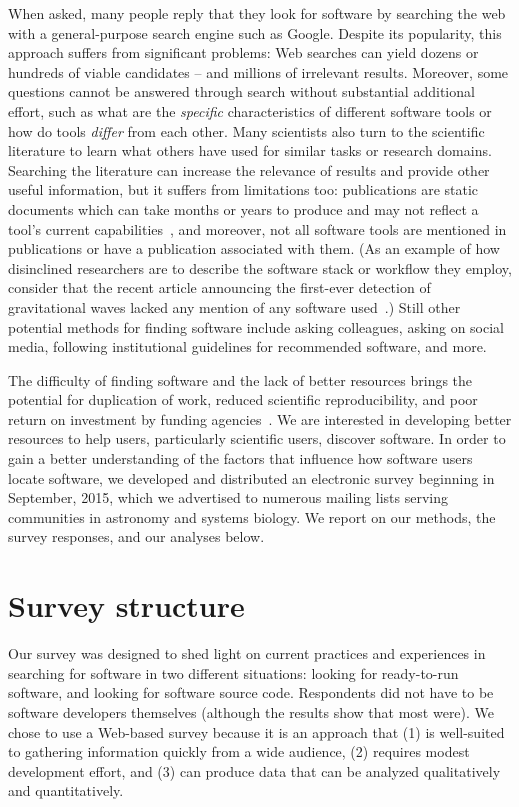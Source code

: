 \documentclass{casicswhitepaper}
\begin{document}
When asked, many people reply that they look for software by searching the web with a general-purpose search engine such as Google.  Despite its popularity, this approach suffers from significant problems: Web searches can yield dozens or hundreds of viable candidates -- and millions of irrelevant results.  Moreover, some questions cannot be answered through search without substantial additional effort, such as what are the \emph{specific} characteristics of different software tools or how do tools \emph{differ} from each other.  Many scientists also turn to the scientific literature to learn what others have used for similar tasks or research domains.  Searching the literature can increase the relevance of results and provide other useful information, but it suffers from limitations too: publications are static documents which can take months or years to produce and may not reflect a tool's current capabilities~\cite{wren_2004}, and moreover, not all software tools are mentioned in publications or have a publication associated with them.  (As an example of how disinclined researchers are to describe the software stack or workflow they employ, consider that the recent article announcing the first-ever detection of gravitational waves lacked any mention of any software used~\cite{abbott2016observation}.)  Still other potential methods for finding software include asking colleagues, asking on social media, following institutional guidelines for recommended software, and more.

The difficulty of finding software and the lack of better resources brings the potential for duplication of work, reduced scientific reproducibility, and poor return on investment by funding agencies~\citep{cannata_2005}.  We are interested in developing better resources to help users, particularly scientific users, discover software.  In order to gain a better understanding of the factors that influence how software users locate software, we developed and distributed an electronic survey beginning in September, 2015, which we advertised to numerous mailing lists serving communities in astronomy and systems biology.  We report on our methods, the survey responses, and our analyses below.


\section{Survey structure}

Our survey was designed to shed light on current practices and experiences in searching for software in two different situations: looking for ready-to-run software, and looking for software source code.  Respondents did not have to be software developers themselves (although the results show that most were).  We chose to use a Web-based survey because it is an approach that (1) is well-suited to gathering information quickly from a wide audience, (2) requires modest development effort, and (3) can produce data that can be analyzed qualitatively and quantitatively.
\end{document}
